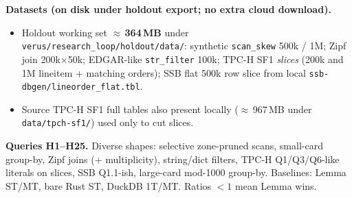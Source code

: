 \documentclass[sigconf, nonacm]{acmart}
\begin{document}
\noindent\textbf{Datasets (on disk under holdout export; no extra cloud download).}
\begin{itemize}
  \item Holdout working set $\approx$\,\textbf{364\,MB} under
        \texttt{verus/research\_loop/holdout/data/}:
        synthetic \texttt{scan\_skew} 500k / 1M; Zipf join 200k$\times$50k;
        EDGAR-like \texttt{str\_filter} 100k; TPC-H SF1 \emph{slices}
        (200k and 1M lineitem + matching orders); SSB flat 500k row slice
        from local \texttt{ssb-dbgen/lineorder\_flat.tbl}.
  \item Source TPC-H SF1 full tables also present locally ($\approx$\,967\,MB under
        \texttt{data/tpch-sf1/}) used only to cut slices.
\end{itemize}

\noindent\textbf{Queries H1--H25.} Diverse shapes: selective zone-pruned scans,
small-card group-by, Zipf joins (+ multiplicity), string/dict filters, TPC-H
Q1/Q3/Q6-like literals on slices, SSB Q1.1-ish, large-card mod-1000 group-by.
Baselines: Lemma ST/MT, bare Rust ST, DuckDB 1T/MT. Ratios $<1$ mean Lemma wins.
\end{document}
